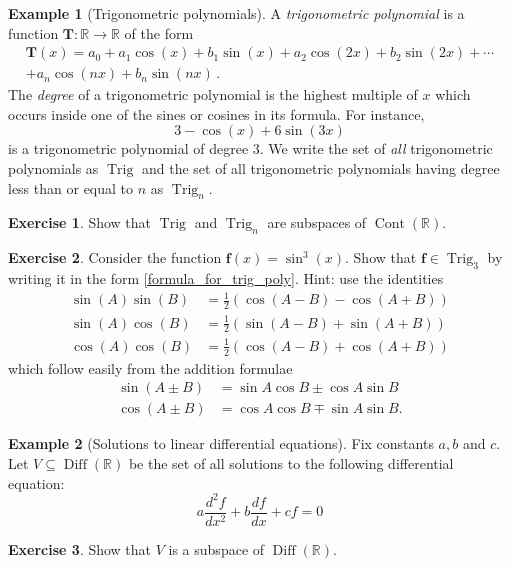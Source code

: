 \documentclass[a4paper,11pt]{book}
\theoremstyle{definition}
\newtheorem{exercise}{Exercise}
\newtheorem{example_environment}{Example}[chapter]
\newcommand{\ve}[1]{\mathbf{#1}}
\newenvironment{example}
	{
		\begin{oframed} 
		\begin{example_environment}
	}
	{
		\end{example_environment}
		\end{oframed}
	}
\DeclareMathOperator{\Cont}{Cont}
\DeclareMathOperator{\Diff}{Diff}
\DeclareMathOperator{\Trig}{Trig}
\begin{document}
\begin{example}[Trigonometric polynomials] \label{trig_poly_example} A {\em trigonometric polynomial} is a function $\ve{T} : \mathbb{R} \rightarrow \mathbb{R}$ of the form
\begin{multline} \label{formula_for_trig_poly}
 \ve{T} (x) = a_0 + a_1 \cos(x) + b_1 \sin(x) + a_2 \cos(2x) + b_2 \sin(2x) + \cdots \\ + a_n \cos(nx) + b_n \sin(nx) \, .
\end{multline}
The {\em degree} of a trigonometric polynomial is the highest multiple of $x$ which occurs inside one of the sines or cosines in its formula. For instance,
\[
 3 - \cos(x) + 6 \sin(3x)
\] 
is a trigonometric polynomial of degree 3. We write the set of {\em all} trigonometric polynomials as $\Trig$ and the set of all trigonometric polynomials having degree less than or equal to $n$ as $\Trig_n$. 

\begin{exercise} Show that $\Trig$ and $\Trig_n$ are subspaces of $\Cont (\mathbb{R})$.
\end{exercise}

\begin{exercise} Consider the function $\ve{f} (x) = \sin^3(x)$. Show that $\ve{f} \in \Trig_3$ by writing it in the form \eqref{formula_for_trig_poly}. Hint: use the identities \label{trig_ex_early}
\begin{align*}
 \sin(A) \sin(B) &= \frac{1}{2}(\cos(A-B) - \cos(A+B)) \\
 \sin(A) \cos(B) &= \frac{1}{2}(\sin(A-B) + \sin(A+B)) \\
 \cos(A)\cos(B) &= \frac{1}{2}(\cos(A-B) + \cos(A+B))
\end{align*}
which follow easily from the addition formulae 
\begin{align*}
\sin(A \pm B) &= \sin A \cos B \pm \cos A \sin B \\
\cos(A \pm B) &= \cos A \cos B \mp \sin A \sin B.
\end{align*}
\end{exercise}

\end{example}


\begin{example}[Solutions to linear differential equations] Fix constants $a,b$ and $c$. Let $V \subseteq \Diff(\mathbb{R})$ be the set of all solutions to the following differential equation:
\[
 a \frac{d^2f}{dx^2} + b \frac{df}{dx} + cf = 0
\]
\begin{exercise} Show that $V$ is a subspace of $\Diff(\mathbb{R})$.
\end{exercise} 
\end{example}
\end{document}

